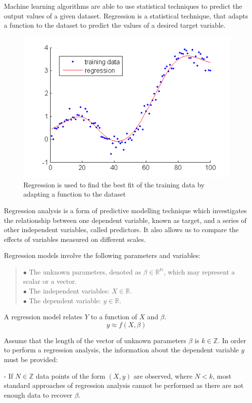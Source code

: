 Machine learning algorithms are able to use statistical techniques to predict the output values of a given dataset. Regression \cite{graybill1994regression} is a statistical technique, that adapts a function to the dataset to predict the values of a desired target variable. 

\begin{figure}[h]
	\centering
	\includegraphics[height=0.42\linewidth]{./figures/regression}
	\caption{Regression is used to find the best fit of the training data by adapting a function to the dataset}
	\label{fig:regression}
\end{figure}

Regression analysis is a form of predictive modelling technique which investigates the relationship between one dependent variable, known as target, and a series of other independent variables, called predictors.  It also allows us to compare the effects of variables measured on different scales. \smallskip

\noindent Regression models involve the following parameters and variables:
\begin{verse}
	$\bullet$ The unknown parameters, denoted as $\beta\in\mathbb{R^\mathbb{N}}$, which may represent a scalar or a vector.\\
	$\bullet$ The independent variables: $X\in\mathbb{R}$.\\
	$\bullet$ The dependent variable: $y\in\mathbb{R}$.
\end{verse}

\noindent A regression model relates $Y$ to a function of $X$ and $\beta$.
$$ y \approx f(X,\beta) $$

Assume that the length of the vector of unknown parameters $\beta$ is $k\in \mathbb{Z}$. In order to perform a regression analysis, the information about the dependent variable $y$ must be provided:\smallskip

\noindent- If $N\in\mathbb{Z}$ data points of the form $(X,y)$ are observed, where $N<k$, most standard approaches of regression analysis cannot be performed as there are not enough data to recover $\beta$.\smallskip

